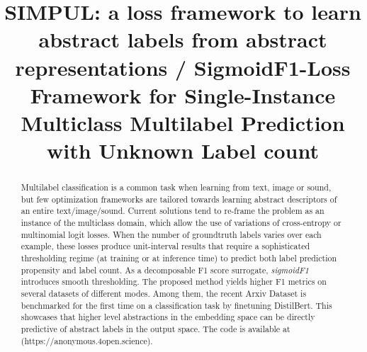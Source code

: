 \documentclass[sigconf,natbib,screen=true,review=true,anonymous]{acmart}
\begin{document}
\title{SIMPUL: a loss framework to learn abstract labels from abstract representations / SigmoidF1-Loss Framework for Single-Instance Multiclass Multilabel Prediction with Unknown Label count}

\begin{abstract}
  Multilabel classification is a common task when learning from text, image or sound, but few optimization frameworks are tailored towards learning abstract descriptors of an entire text/image/sound. Current solutions tend to re-frame the problem as an instance of the multiclass domain, which allow the use of variations of cross-entropy or multinomial logit losses. When the number of groundtruth labels varies over each example, these losses produce unit-interval results that require a sophisticated thresholding regime (at training or at inference time) to predict both label prediction propensity and label count. As a decomposable F1 score surrogate, \emph{sigmoidF1} introduces smooth thresholding. The proposed method yields higher F1 metrics on several datasets of different modes. Among them, the recent Arxiv Dataset is benchmarked for the first time on a classification task by finetuning DistilBert.  This showcases that higher level abstractions in the embedding space can be directly predictive of abstract labels in the output space. The code is available at (https://anonymous.4open.science). 
\end{abstract}



\maketitle

\acresetall
\end{document}
